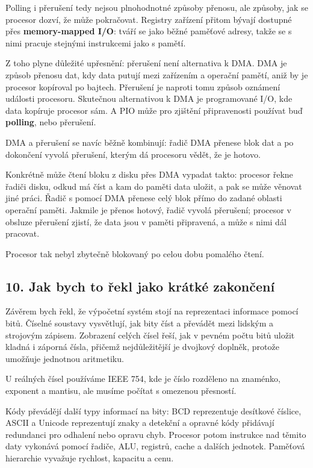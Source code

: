 \documentclass[11pt,a4paper]{article}
\begin{document}
Polling i přerušení tedy nejsou plnohodnotné způsoby přenosu, ale způsoby, jak se procesor dozví, že může pokračovat. Registry zařízení přitom bývají dostupné přes \textbf{memory-mapped I/O}: tváří se jako běžné paměťové adresy, takže se s nimi pracuje stejnými instrukcemi jako s pamětí.

Z toho plyne důležité upřesnění: přerušení není alternativa k DMA. DMA je způsob přenosu dat, kdy data putují mezi zařízením a operační pamětí, aniž by je procesor kopíroval po bajtech. Přerušení je naproti tomu způsob oznámení události procesoru. Skutečnou alternativou k DMA je programované I/O, kde data kopíruje procesor sám. A PIO může pro zjištění připravenosti používat buď \textbf{polling}, nebo přerušení.

DMA a přerušení se navíc běžně kombinují: řadič DMA přenese blok dat a po dokončení vyvolá přerušení, kterým dá procesoru vědět, že je hotovo.

Konkrétně může čtení bloku z disku přes DMA vypadat takto: procesor řekne řadiči disku, odkud má číst a kam do paměti data uložit, a pak se může věnovat jiné práci. Řadič s pomocí DMA přenese celý blok přímo do zadané oblasti operační paměti. Jakmile je přenos hotový, řadič vyvolá přerušení; procesor v obsluze přerušení zjistí, že data jsou v paměti připravená, a může s nimi dál pracovat.

Procesor tak nebyl zbytečně blokovaný po celou dobu pomalého čtení.

\subsection*{10. Jak bych to řekl jako krátké zakončení}

Závěrem bych řekl, že výpočetní systém stojí na reprezentaci informace pomocí bitů. Číselné soustavy vysvětlují, jak bity číst a převádět mezi lidským a strojovým zápisem. Zobrazení celých čísel řeší, jak v pevném počtu bitů uložit kladná i záporná čísla, přičemž nejdůležitější je dvojkový doplněk, protože umožňuje jednotnou aritmetiku.

U reálných čísel používáme IEEE 754, kde je číslo rozděleno na znaménko, exponent a mantisu, ale musíme počítat s omezenou přesností.

Kódy převádějí další typy informací na bity: BCD reprezentuje desítkové číslice, ASCII a Unicode reprezentují znaky a detekční a opravné kódy přidávají redundanci pro odhalení nebo opravu chyb. Procesor potom instrukce nad těmito daty vykonává pomocí řadiče, ALU, registrů, cache a dalších jednotek. Paměťová hierarchie vyvažuje rychlost, kapacitu a cenu.
\end{document}

